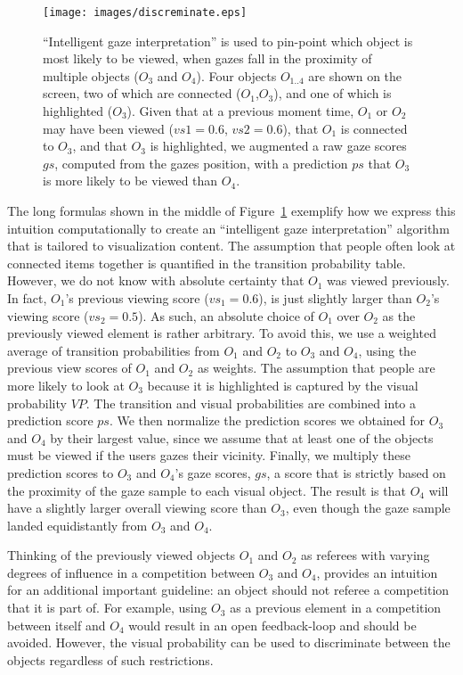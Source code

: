 \begin{figure}[htb]
  \centering
  \texttt{[image: images/discreminate.eps]}
  \caption{``Intelligent gaze interpretation'' is used to pin-point which object is most likely to be viewed, when gazes fall in the proximity of multiple objects ($O_3$ and $O_4$). Four objects $O_{1..4}$ are shown on the screen, two of which are connected ($O_1$,$O_3$), and one of which is highlighted ($O_3$). Given that at a previous moment time, $O_1$ or $O_2$ may have been viewed ($vs1 = 0.6$, $vs2=0.6$), that $O_1$ is connected to $O_3$, and that $O_3$ is highlighted, we augmented a raw gaze scores $gs$, computed from the gazes position, with  a prediction $ps$ that $O_3$ is more likely to be viewed than $O_4$.}
	\label{fig:discreminate}
\end{figure}

The long formulas shown in the middle of Figure~\ref{fig:discreminate} exemplify how we express this intuition computationally to create an ``intelligent gaze interpretation'' algorithm that is tailored to visualization content. The assumption that people often look at connected items together is quantified in the transition probability table. However, we do not know with absolute certainty that $O_1$ was viewed previously. In fact, $O_1$'s previous viewing score ($vs_1=0.6$), is just slightly larger than $O_2$'s viewing score ($vs_2=0.5$). As such, an absolute choice of $O_1$ over $O_2$ as the previously viewed element is rather arbitrary. To avoid this, we use a weighted average of transition probabilities from $O_1$ and $O_2$ to $O_3$ and $O_4$, using the previous view scores of $O_1$ and $O_2$ as weights.  The assumption that people are more likely to look at $O_3$ because it is highlighted is captured by the visual probability $VP$. The transition and visual probabilities are combined into a prediction score $ps$. We then normalize the prediction scores we obtained for $O_3$ and $O_4$ by their largest value, since we assume that at least one of the objects must be viewed if the users gazes their vicinity. Finally, we multiply these prediction scores to $O_3$ and $O_4$'s gaze scores, $gs$, a score that is strictly based on the proximity of the gaze sample to each visual object. The result is that $O_4$ will have a slightly larger overall viewing score than $O_3$, even though the gaze sample landed equidistantly from $O_3$ and $O_4$. 

Thinking of the previously viewed objects $O_1$ and $O_2$ as referees with varying degrees of influence in a competition between $O_3$ and $O_4$, provides an intuition for an additional important guideline: an object should not referee a competition that it is part of. For example, using $O_3$ as a previous element in a competition between itself and $O_4$ would result in an open feedback-loop and should be avoided. However, the visual probability can be used to discriminate between the objects regardless of such restrictions.

